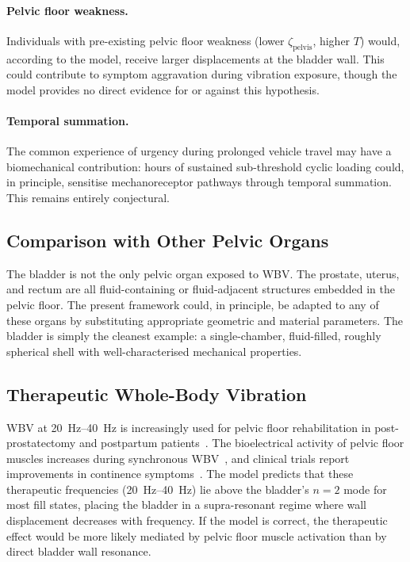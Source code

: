 \paragraph{Pelvic floor weakness.}
Individuals with pre-existing pelvic floor weakness (lower
$\zeta_\mathrm{pelvis}$, higher $T$) would, according to the model, receive
larger displacements at the bladder wall.  This could contribute to symptom
aggravation during vibration exposure, though the model provides no direct
evidence for or against this hypothesis.

\paragraph{Temporal summation.}
The common experience of urgency during prolonged vehicle travel may have a
biomechanical contribution: hours of sustained sub-threshold cyclic loading
could, in principle, sensitise mechanoreceptor pathways through temporal
summation.  This remains entirely conjectural.


\subsection{Comparison with Other Pelvic Organs}
\label{sec:pelvic}

The bladder is not the only pelvic organ exposed to WBV.  The prostate,
uterus, and rectum are all fluid-containing or fluid-adjacent structures
embedded in the pelvic floor.  The present framework could, in principle,
be adapted to any of these organs by substituting appropriate geometric
and material parameters.  The bladder is simply the cleanest example: a
single-chamber, fluid-filled, roughly spherical shell with well-characterised
mechanical properties.


\subsection{Therapeutic Whole-Body Vibration}
\label{sec:therapeutic}

WBV at \SIrange{20}{40}{\hertz} is increasingly used for pelvic floor
rehabilitation in post-prostatectomy and postpartum
patients~\cite{Pelvic2019}.  The bio\-electrical activity of pelvic floor
muscles increases during synchronous WBV~\cite{Lauper2009}, and clinical
trials report improvements in continence
symptoms~\cite{NCT03325660}.  The model predicts that these therapeutic
frequencies (\SIrange{20}{40}{\hertz}) lie above the bladder's $n = 2$ mode
for most fill states, placing the bladder in a supra-resonant regime where
wall displacement decreases with frequency.  If the model is correct, the
therapeutic effect would be more likely mediated by pelvic floor muscle
activation than by direct bladder wall resonance.


